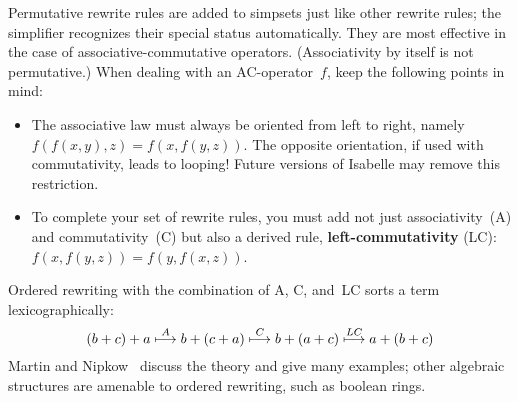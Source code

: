 Permutative rewrite rules are added to simpsets just like other rewrite
rules; the simplifier recognizes their special status automatically.  They
are most effective in the case of associative-commutative operators.
(Associativity by itself is not permutative.)  When dealing with an
AC-operator~$f$, keep the following points in mind:
\begin{itemize}
\item The associative law must always be oriented from left to right, namely
  $f(f(x,y),z) = f(x,f(y,z))$.  The opposite orientation, if used with
  commutativity, leads to looping!  Future versions of Isabelle may remove
  this restriction.

\item To complete your set of rewrite rules, you must add not just
  associativity~(A) and commutativity~(C) but also a derived rule, {\bf
    left-commutativity} (LC): $f(x,f(y,z)) = f(y,f(x,z))$.
\end{itemize}
Ordered rewriting with the combination of A, C, and~LC sorts a term
lexicographically:
\[\def\maps#1{\stackrel{#1}{\longmapsto}}
 (b+c)+a \maps{A} b+(c+a) \maps{C} b+(a+c) \maps{LC} a+(b+c) \]
Martin and Nipkow~\cite{martin-nipkow} discuss the theory and give many
examples; other algebraic structures are amenable to ordered rewriting,
such as boolean rings.

